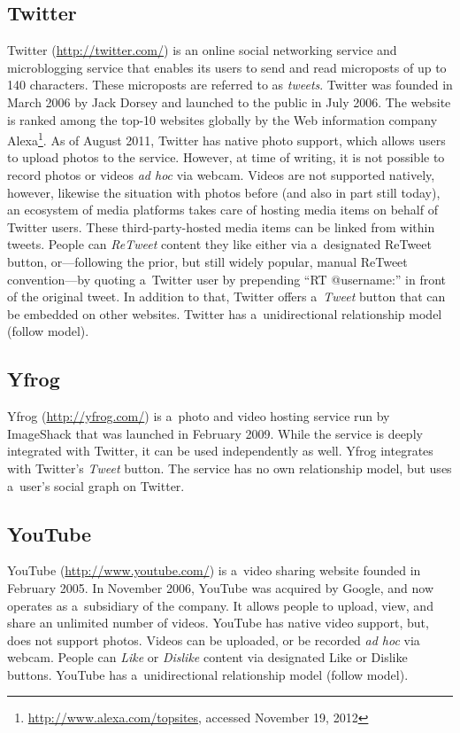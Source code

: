 \subsection{Twitter}
\label{sec:twitter}

Twitter (\url{http://twitter.com/})
is an online social networking service
and microblogging service
that enables its users to send and read microposts
of up to 140 characters.
These microposts are referred to as \emph{tweets}.
Twitter was founded in March 2006 by Jack Dorsey
and launched to the public in July 2006.
The website is ranked among the top-10 websites globally
by the Web information company
Alexa\footnote{\url{http://www.alexa.com/topsites},
accessed November 19, 2012}.
As of August 2011, Twitter has native photo support,
which allows users to upload photos to the service.
However, at time of writing, it is not possible to 
record photos or videos \emph{ad hoc} via webcam.
Videos are not supported natively, however,
likewise the situation with photos before
(and also in part still today),
an ecosystem of media platforms takes care of
hosting media items on behalf of Twitter users.
These third-party-hosted media items
can be linked from within tweets.
People can \emph{ReTweet} content they like either
via a~designated ReTweet button,
or---following the prior, but still widely popular,
manual ReTweet convention---by
quoting a~Twitter user by prepending ``RT @username:''
in front of the original tweet.
In addition to that, Twitter offers
a~\emph{Tweet} button that can be embedded on other websites.
Twitter has a~unidirectional relationship model (follow model).

\subsection{Yfrog}

Yfrog (\url{http://yfrog.com/})
is a~photo and video hosting service run by ImageShack
that was launched in February 2009.
While the service is deeply integrated with Twitter,
it can be used independently as well.
Yfrog integrates with Twitter's \emph{Tweet} button.
The service has no own relationship model,
but uses a~user's social graph on Twitter.

\subsection{YouTube}

YouTube (\url{http://www.youtube.com/})
is a~video sharing website founded in February 2005.
In November 2006, YouTube was acquired by Google,
and now operates as a~subsidiary of the company.
It allows people to upload, view,
and share an unlimited number of videos.
YouTube has native video support, but, does not support photos.
Videos can be uploaded, or be recorded \emph{ad hoc} via webcam.
People can \emph{Like} or \emph{Dislike} content
via designated Like or Dislike buttons.
YouTube has a~unidirectional relationship model (follow model).

